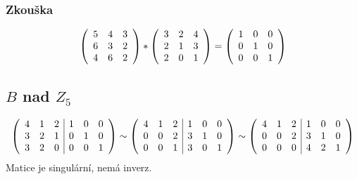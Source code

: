 \documentclass[a4paper]{article}
\begin{document}
\subsubsection{Zkouška}%
\begin{equation*}
\left(
\begin{array}{c c c}
    5 & 4 & 3 \\
    6 & 3 & 2 \\
    4 & 6 & 2
\end{array}
\right)
*
\left(
\begin{array}{c c c }
    3 & 2 & 4 \\
    2 & 1 & 3 \\
    2 & 0 & 1
\end{array}
\right)
=
\left(
\begin{array}{c c c}
    1 & 0 & 0\\
    0 & 1 & 0\\
    0 & 0 & 1
\end{array}
\right)
\end{equation*}
\subsection{$B$ nad $Z_5$}%
\begin{align*}
    \left(
    \begin{array}{c c c | c c c }
        4 & 1 & 2 & 1 & 0 & 0 \\
        3 & 2 & 1 & 0 & 1 & 0 \\
        3 & 2 & 0 & 0 & 0 & 1
    \end{array}
    \right)
    \sim
    \left(
    \begin{array}{c c c | c c c }
        4 & 1 & 2 & 1 & 0 & 0 \\
        0 & 0 & 2 & 3 & 1 & 0 \\
        0 & 0 & 1 & 3 & 0 & 1
    \end{array}
    \right)
    \sim
    \left(
    \begin{array}{c c c | c c c }
        4 & 1 & 2 & 1 & 0 & 0 \\
        0 & 0 & 2 & 3 & 1 & 0 \\
        0 & 0 & 0 & 4 & 2 & 1
    \end{array}
    \right)
\end{align*}
Matice je singulární, nemá inverz.
\end{document}
